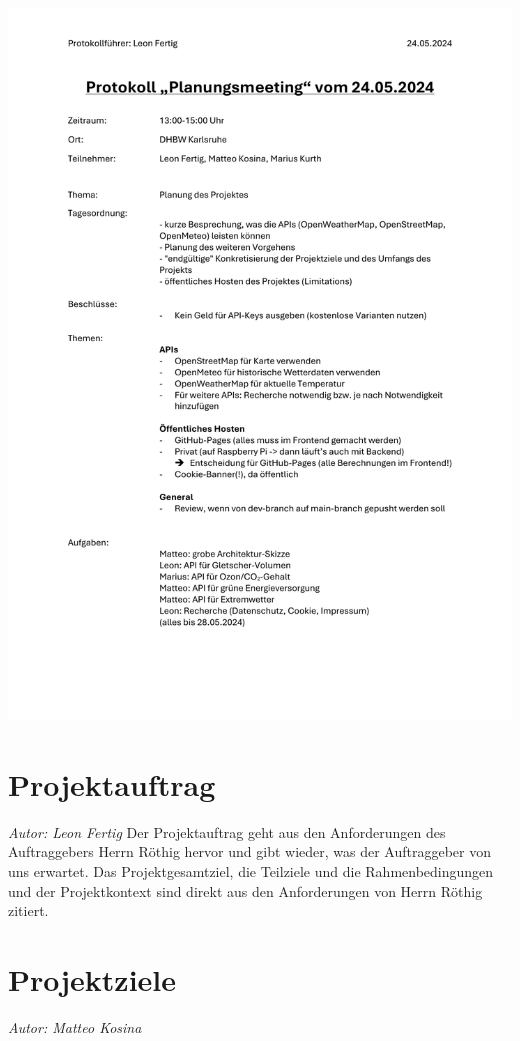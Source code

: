 \documentclass[12pt]{article}
\begin{document}
\includegraphics[width=\textwidth]{Planungsdokumente/graphics/Protokoll2.pdf}

\section{Projektauftrag}
{\it Autor: Leon Fertig}
\newline
Der Projektauftrag geht aus den Anforderungen des Auftraggebers Herrn Röthig hervor und gibt wieder, was der Auftraggeber von uns erwartet. Das Projektgesamtziel, die Teilziele und die Rahmenbedingungen und der Projektkontext sind direkt aus den Anforderungen von Herrn Röthig zitiert.


\section{Projektziele}
{\it Autor: Matteo Kosina}
\newline
\end{document}
